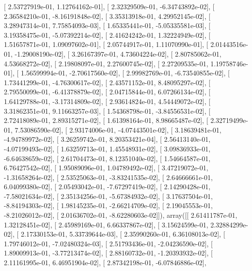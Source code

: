 \documentclass{article}
\begin{document}
       [  2.53727919e-01,   1.12764162e-01],
       [  2.32329509e-01,  -6.34743892e-02],
       [  2.36584210e-01,  -8.16191848e-02],
       [  3.35313918e-01,   4.29952145e-02],
       [  3.28947314e-01,   7.75854093e-03],
       [  1.65335441e-01,  -5.05335581e-03],
       [  3.19358475e-01,  -5.07392214e-02],
       [  2.41624242e-01,   1.32224949e-02],
       [  1.51657871e-01,   1.09097602e-01],
       [  2.05744917e-01,   1.11070990e-01],
       [  2.01443516e-01,  -1.29008190e-02],
       [  3.26167397e-01,   4.73604224e-02],
       [  2.80785062e-01,   4.53668272e-02],
       [  2.19808097e-01,   2.27600745e-02],
       [  2.27209535e-01,   1.19758746e-01],
       [  1.56599994e-01,  -2.70617560e-02],
       [  2.99982769e-01,  -6.73540855e-02],
       [  1.73441299e-01,  -4.76300617e-02],
       [  2.43571152e-01,   8.48095297e-02],
       [  2.79550099e-01,  -6.41378879e-02],
       [  2.04715844e-01,   6.07266134e-02],
       [  1.64129788e-01,  -3.17314809e-02],
       [  2.93614824e-01,   4.54449072e-02],
       [  3.31862351e-01,   9.11663257e-03],
       [  1.54368798e-01,  -3.84556531e-02],
       [  2.72418089e-01,   2.89315271e-02],
       [  1.61398164e-01,   8.98665487e-02],
       [  2.32719499e-01,   7.53086590e-02],
       [  2.93174006e-01,  -4.07443501e-02],
       [  3.18639481e-01,  -4.94789972e-02],
       [  3.26259742e-01,   8.20353421e-04],
       [  2.56413140e-01,  -4.07199493e-02],
       [  1.63259713e-01,   1.45548931e-02],
       [  3.09836933e-01,  -6.64638659e-02],
       [  2.61704473e-01,   8.12351040e-02],
       [  1.54664587e-01,   6.76427542e-02],
       [  1.95089096e-01,   1.04789492e-02],
       [  3.47219072e-01,  -1.31658264e-02],
       [  2.53525063e-01,  -3.83241535e-02],
       [  2.64666661e-01,   6.04099380e-02],
       [  2.05493042e-01,  -7.67297419e-02],
       [  2.14290428e-01,  -7.58021634e-02],
       [  2.35134256e-01,  -5.67384932e-02],
       [  3.17637504e-01,  -8.84194303e-02],
       [  1.98145235e-01,  -2.66214709e-02],
       [  2.19045553e-01,  -8.21026012e-02],
       [  2.01636702e-01,  -8.62280603e-02]]), array([[  2.61411787e-01,   1.32128451e-02],
       [  2.45989169e-01,   6.66337867e-02],
       [  3.15624599e-01,   2.32884299e-02],
       [  2.17330153e-01,   5.33739644e-03],
       [  2.35990260e-01,   6.36108013e-02],
       [  1.79746012e-01,  -7.02480324e-03],
       [  2.51793436e-01,  -2.04236590e-02],
       [  1.89009913e-01,  -3.77213474e-02],
       [  2.88160732e-01,  -1.20393932e-02],
       [  2.11161995e-01,   6.46951904e-02],
       [  2.87342198e-01,  -6.07846886e-02],
\end{document}
